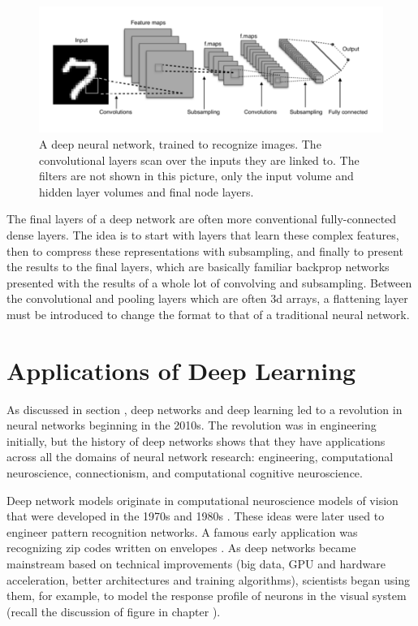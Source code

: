 \begin{figure}[h]
\centering
\includegraphics[scale=.45]{./images/deepNet.png}
\caption[Adapted from a creative commons image by Aphex34 at \url{https://commons.wikimedia.org/wiki/File:Typical_cnn.png} ]{A deep neural network, trained to recognize images. The convolutional layers scan over the inputs they are linked to. The filters are not shown in this picture, only the input volume and hidden layer volumes and final node layers. }
\label{deep_net2}
\end{figure}

The final layers of a deep network are often more conventional fully-connected dense layers. The idea is to start with layers that learn these complex features, then to compress these representations with subsampling, and finally to present the results to the final layers, which are basically familiar backprop networks presented with the results of a whole lot of convolving and subsampling. Between the convolutional and pooling layers which are often 3d arrays, a flattening layer must be introduced to change the format to that of a traditional neural network.

\section{Applications of Deep Learning}

 
As discussed in section , deep networks and deep learning led to a revolution in neural networks beginning in the 2010s. The revolution was in engineering initially, but the history of deep networks shows that they have applications across all the domains of neural network research: engineering, computational neuroscience, connectionism, and computational cognitive neuroscience. 

Deep network models originate in  computational neuroscience models of vision that were developed in the 1970s and 1980s \cite{fukushima1982neocognitron}.  These ideas were later used to engineer pattern recognition networks. A famous early application was recognizing zip codes written on envelopes \cite{lecun1989backpropagation}. As deep networks became mainstream based on technical improvements (big data, GPU and hardware acceleration, better architectures and training algorithms), scientists began using them, for example, to model the response profile of neurons in the visual system (recall the discussion of figure  in chapter ). 


